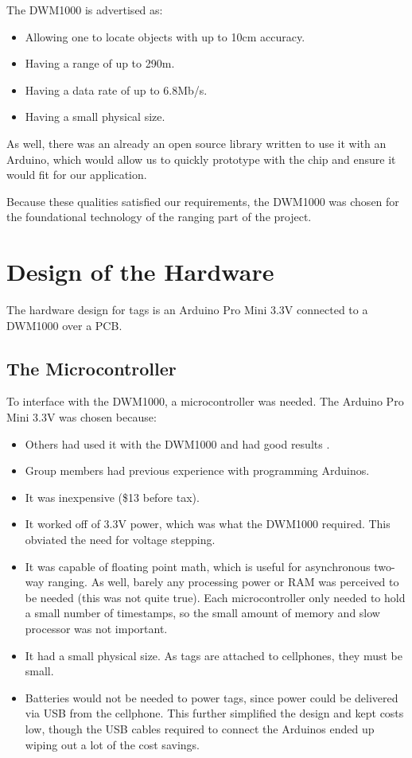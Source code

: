 The DWM1000 is advertised as:
\begin{itemize}
	\item Allowing one to locate objects with up to 10cm accuracy.
	\item Having a range of up to 290m.
	\item Having a data rate of up to 6.8Mb/s.
	\item Having a small physical size. 
\end{itemize}

As well, there was an already an open source library written to use it with an Arduino, which would allow us to quickly prototype with the chip and ensure it would fit for our application.

Because these qualities satisfied our requirements, the DWM1000 was chosen for the foundational technology of the ranging part of the project. 

\section{Design of the Hardware}
The hardware design for tags is an Arduino Pro Mini 3.3V connected to a DWM1000 over a PCB. 

\subsection{The Microcontroller}
To interface with the DWM1000, a microcontroller was needed. The Arduino Pro Mini 3.3V was chosen because:
\begin{itemize}
	\item Others had used it with the DWM1000 and had good results \cite{LPSMini}.
	\item Group members had previous experience with programming Arduinos.
	\item It was inexpensive (\$13 before tax).
	\item It worked off of 3.3V power, which was what the DWM1000 required. This obviated the need for voltage stepping.
	\item It was capable of floating point math, which is useful for asynchronous two-way ranging. As well, barely any processing power or RAM was perceived to be needed (this was not quite true). Each microcontroller only needed to hold a small number of timestamps, so the small amount of memory and slow processor was not important.
	\item It had a small physical size. As tags are attached to cellphones, they must be small.
	\item Batteries would not be needed to power tags, since power could be delivered via USB from the cellphone. This further simplified the design and kept costs low, though the USB cables required to connect the Arduinos ended up wiping out a lot of the cost savings.
\end{itemize}

